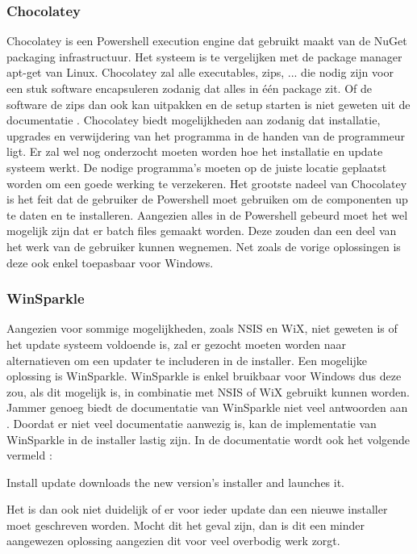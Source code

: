 \documentclass{article}
\begin{document}
\subsubsection{Chocolatey \citep{chocoMain}}
Chocolatey is een Powershell execution engine dat gebruikt maakt van de NuGet packaging infrastructuur.
Het systeem is te vergelijken met de package manager apt-get van Linux.
Chocolatey zal alle executables, zips, ... die nodig zijn voor een stuk software encapsuleren zodanig dat alles in \'e\'en package zit.
Of de software de zips dan ook kan uitpakken en de setup starten is niet geweten uit de documentatie \citep{chocoDoc}.
Chocolatey biedt mogelijkheden aan zodanig dat installatie, upgrades en verwijdering van het programma in de handen van de programmeur ligt.
Er zal wel nog onderzocht moeten worden hoe het installatie en update systeem werkt.
De nodige programma's moeten op de juiste locatie geplaatst worden om een goede werking te verzekeren.
Het grootste nadeel van Chocolatey is het feit dat de gebruiker de Powershell moet gebruiken om de componenten up te daten en te installeren.
Aangezien alles in de Powershell gebeurd moet het wel mogelijk zijn dat er batch files gemaakt worden.
Deze zouden dan een deel van het werk van de gebruiker kunnen wegnemen.
Net zoals de vorige oplossingen is deze ook enkel toepasbaar voor Windows.

\subsubsection{WinSparkle \citep{winsparkleMain}}
Aangezien voor sommige mogelijkheden, zoals NSIS en WiX, niet geweten is of het update systeem voldoende is, zal er gezocht moeten worden naar alternatieven om een updater te includeren in de installer.
Een mogelijke oplossing is WinSparkle.
WinSparkle is enkel bruikbaar voor Windows dus deze zou, als dit mogelijk is, in combinatie met NSIS of WiX gebruikt kunnen worden.
Jammer genoeg biedt de documentatie van WinSparkle niet veel antwoorden aan  \citep{winsparkleDoc}.
Doordat er niet veel documentatie aanwezig is, kan de implementatie van WinSparkle in de installer lastig zijn.
In de documentatie wordt ook het volgende vermeld \citep{winsparkleDocUser}:

\begin{displayquote}
Install update downloads the new version's installer and launches it.
\end{displayquote}

Het is dan ook niet duidelijk of er voor ieder update dan een nieuwe installer moet geschreven worden.
Mocht dit het geval zijn, dan is dit een minder aangewezen oplossing aangezien dit voor veel overbodig werk zorgt.
\end{document}
